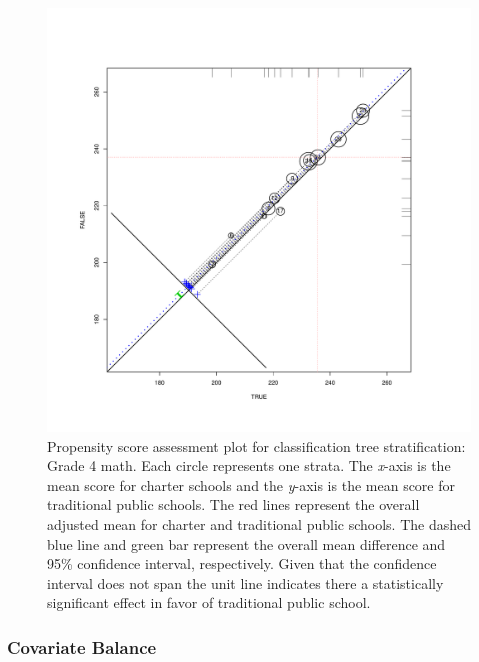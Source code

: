 \documentclass[letterpaper,12pt]{article} %
\begin{document}
\setlength{\belowcaptionskip}{-10pt}
\begin{figure}[t!]
\begin{center}
\includegraphics[width=\textwidth,trim=0 .7in 0 .7in]{../Figures2009/g4math-circpsa-tree.pdf}
\caption[Propensity score assessment plot for classification tree stratification: Grade 4 math]{Propensity score assessment plot for classification tree stratification: Grade 4 math. Each circle represents one strata. The \textit{x}-axis is the mean score for charter schools and the \textit{y}-axis is the mean score for traditional public schools. The red lines represent the overall adjusted mean for charter and traditional public schools. The dashed blue line and green bar represent the overall mean difference and 95\% confidence interval, respectively. Given that the confidence interval does not span the unit line indicates there a statistically significant effect in favor of traditional public school.}
\label{fig:g4math:circpsa:tree}
\end{center}
\end{figure}
\setlength{\belowcaptionskip}{0pt}

\subsubsection{Covariate Balance}
\end{document}
